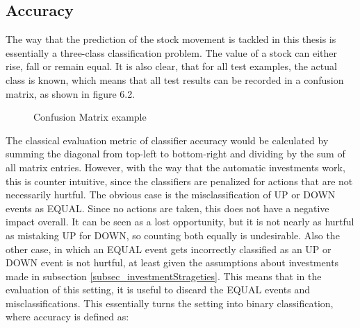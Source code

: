 \subsection{Accuracy}
The way that the prediction of the stock movement is tackled in this thesis is essentially a three-class classification problem. The value of a stock can either rise, fall or remain equal. It is also clear, that for all test examples, the actual class is known, which means that all test results can be recorded in a confusion matrix, as shown in figure 6.2.
\\
\begin{figure}[h]
\centering
{}
\label{fig_confusionMatrix}
\caption{Confusion Matrix example}
\end{figure}

The classical evaluation metric of classifier accuracy would be calculated by summing the diagonal from top-left to bottom-right and dividing by the sum of all matrix entries. However, with the way that the automatic investments work, this is counter intuitive, since the classifiers are penalized for actions that are not necessarily hurtful. The obvious case is the misclassification of UP or DOWN events as EQUAL. Since no actions are taken, this does not have a negative impact overall. It can be seen as a lost opportunity, but it is not nearly as hurtful as mistaking UP for DOWN, so counting both equally is undesirable. Also the other case, in which an EQUAL event gets incorrectly classified as an UP or DOWN event is not hurtful, at least given the assumptions about investments made in subsection \ref{subsec_investmentStrageties}. This means that in the evaluation of this setting, it is useful to discard the EQUAL events and misclassifications. This essentially turns the setting into binary classification, where accuracy is defined as:

